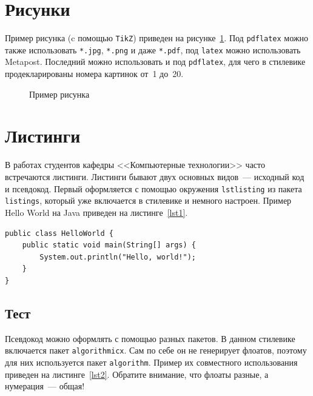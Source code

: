 \documentclass[]{itmo-student-thesis}
\begin{document}
\section{Рисунки}

Пример рисунка (c помощью \texttt{TikZ}) приведен на рисунке~\ref{fig1}. Под \texttt{pdflatex} можно также
использовать \texttt{*.jpg}, \texttt{*.png} и даже \texttt{*.pdf}, под \texttt{latex} можно использовать
Metapost. Последний можно использовать и под \texttt{pdflatex}, для чего в стилевике продекларированы
номера картинок от~1 до~20.

\begin{figure}[!h]
\caption{Пример рисунка}\label{fig1}
\centering
{}
\end{figure}

\section{Листинги}

В работах студентов кафедры <<Компьютерные технологии>> часто встречаются листинги. Листинги бывают
двух основных видов~--- исходный код и псевдокод. Первый оформляется с помощью окружения \texttt{lstlisting}
из пакета \texttt{listings}, который уже включается в стилевике и немного настроен. Пример Hello World на Java
приведен на листинге~\ref{lst1}.

\begin{lstlisting}[float=!h,caption={Пример исходного кода на Java},label={lst1}]
public class HelloWorld {
	public static void main(String[] args) {
		System.out.println("Hello, world!");
	}
}
\end{lstlisting}

\subsection{Тест}

Псевдокод можно оформлять с помощью разных пакетов. В данном стилевике включается пакет \texttt{algorithmicx}.
Сам по себе он не генерирует флоатов, поэтому для них используется пакет \texttt{algorithm}.
Пример их совместного использования приведен на листинге~\ref{lst2}. Обратите внимание, что флоаты разные, а 
нумерация~--- общая!
\end{document}
